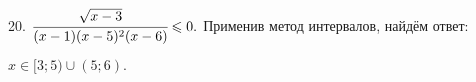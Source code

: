 20. $\cfrac{\sqrt{x-3}}{(x-1)(x-5)^2(x-6)}\leqslant0.$
Применив метод интервалов, найдём ответ:
\begin{figure}[ht!]
\end{figure}
$x\in[3;5)\cup(5;6).$\\
